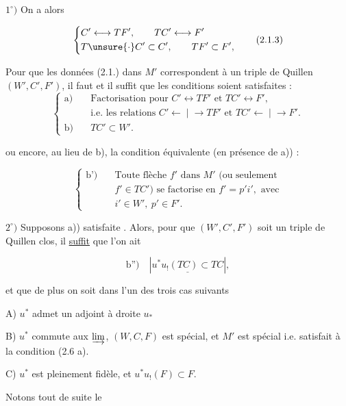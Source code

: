 $1^\circ)$ On a alors

\[
\left\{\begin{aligned}
&C'\longleftrightarrow TF',\qquad TC'\longleftrightarrow F'\\
&T\unsure{\cdot} C'\subset C',\qquad TF'\subset F',
\end{aligned}\right.\tag*{(2.1.3)}
\]

Pour que les données (2.1.) dans $M'$ \unsure{//|))} correspondent à un triple de Quillen $(W',C',F')$, il
faut et il suffit que les conditions 
soient satisfaites :
\[
\left\{\begin{aligned}
\text{a)}\quad &\text{Factorisation pour } C'\longleftrightarrow TF'\text{ et }TC'\longleftrightarrow F',\\
&\text{i.e. les relations } C' \mathrel{\longleftarrow\!\mid\!\longrightarrow} TF'\text{ et }TC' \mathrel{\longleftarrow\!\mid\!\longrightarrow} F'.\\
\text{b)}\quad &TC'\subset W'.
\end{aligned}\right.\tag*{(2.1.4)}
\]

ou encore, au lieu de b), la condition équivalente
(en présence de a)) :

\[
\left\{\begin{aligned}
\text{b')}\quad &\text{Toute flèche }f'\text{ dans }M'\text{ (ou seulement}\\
&f'\in TC')\text{ se factorise en }f'=p'i',\text{ avec}\\
&i'\in W',\ p'\in F'.
\end{aligned}\right.\tag*{(2.1.5)}
\]

$2^\circ)$ Supposons  a)) satisfaite . Alors, pour que
$(W',C',F')$ soit un triple de Quillen clos,
il \uline{suffit} que l'on ait

\[
\text{b'')}\quad\left|\underline{u^*u_!(TC)\subset TC}\right|,\tag*{(2.1.6)}
\]

et que de plus on soit dans l'un des
trois cas suivants

A) $u^*$ admet un adjoint à droite $u_*$

B) $u^*$ commute aux  $\varinjlim$, $(W,C,F)$
est spécial, et $M'$ est spécial i.e. satisfait à la
condition (2.6 a).

C) $u^*$ est pleinement fidèle, et $u^*u_!(F)\subset F$.

Notons tout de suite le

